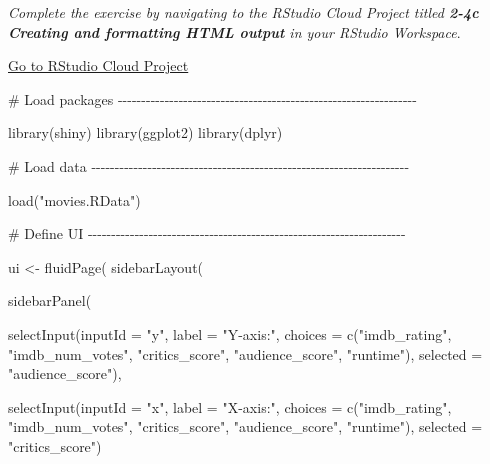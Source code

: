 \documentclass[
  letterpaper,
  DIV=11,
  numbers=noendperiod]{scrreprt}
\newenvironment{Shaded}{\begin{snugshade}}{\end{snugshade}}
\newcommand{\AttributeTok}[1]{\textcolor[rgb]{0.40,0.46,0.14}{#1}}
\newcommand{\CommentTok}[1]{\textcolor[rgb]{0.37,0.37,0.37}{#1}}
\newcommand{\FunctionTok}[1]{\textcolor[rgb]{0.28,0.35,0.67}{#1}}
\newcommand{\NormalTok}[1]{\textcolor[rgb]{0.00,0.46,0.62}{#1}}
\newcommand{\OtherTok}[1]{\textcolor[rgb]{0.00,0.46,0.62}{#1}}
\newcommand{\StringTok}[1]{\textcolor[rgb]{0.13,0.47,0.30}{#1}}
\begin{document}
\emph{Complete the exercise by navigating to the RStudio Cloud Project
titled \textbf{2-4c Creating and formatting HTML output} in your RStudio
Workspace}.

\href{https://rstudio.cloud/spaces/81721/join?access_code=I4VJaNsKfTqR3Td9hLP7E1nz8\%2FtMg6Xbw9Bgqumv}{
Go to RStudio Cloud Project}

\begin{Shaded}
\begin{Highlighting}[]
\CommentTok{\# Load packages {-}{-}{-}{-}{-}{-}{-}{-}{-}{-}{-}{-}{-}{-}{-}{-}{-}{-}{-}{-}{-}{-}{-}{-}{-}{-}{-}{-}{-}{-}{-}{-}{-}{-}{-}{-}{-}{-}{-}{-}{-}{-}{-}{-}{-}{-}{-}{-}{-}{-}{-}{-}{-}{-}{-}{-}{-}{-}{-}{-}{-}{-}{-}{-}}

\FunctionTok{library}\NormalTok{(shiny)}
\FunctionTok{library}\NormalTok{(ggplot2)}
\FunctionTok{library}\NormalTok{(dplyr)}

\CommentTok{\# Load data {-}{-}{-}{-}{-}{-}{-}{-}{-}{-}{-}{-}{-}{-}{-}{-}{-}{-}{-}{-}{-}{-}{-}{-}{-}{-}{-}{-}{-}{-}{-}{-}{-}{-}{-}{-}{-}{-}{-}{-}{-}{-}{-}{-}{-}{-}{-}{-}{-}{-}{-}{-}{-}{-}{-}{-}{-}{-}{-}{-}{-}{-}{-}{-}{-}{-}{-}{-}}

\FunctionTok{load}\NormalTok{(}\StringTok{"movies.RData"}\NormalTok{)}

\CommentTok{\# Define UI {-}{-}{-}{-}{-}{-}{-}{-}{-}{-}{-}{-}{-}{-}{-}{-}{-}{-}{-}{-}{-}{-}{-}{-}{-}{-}{-}{-}{-}{-}{-}{-}{-}{-}{-}{-}{-}{-}{-}{-}{-}{-}{-}{-}{-}{-}{-}{-}{-}{-}{-}{-}{-}{-}{-}{-}{-}{-}{-}{-}{-}{-}{-}{-}{-}{-}{-}{-}}

\NormalTok{ui }\OtherTok{\textless{}{-}} \FunctionTok{fluidPage}\NormalTok{(}
  \FunctionTok{sidebarLayout}\NormalTok{(}
    
    \FunctionTok{sidebarPanel}\NormalTok{(}
      
      \FunctionTok{selectInput}\NormalTok{(}\AttributeTok{inputId =} \StringTok{"y"}\NormalTok{,}
                  \AttributeTok{label =} \StringTok{"Y{-}axis:"}\NormalTok{,}
                  \AttributeTok{choices =} \FunctionTok{c}\NormalTok{(}\StringTok{"imdb\_rating"}\NormalTok{, }\StringTok{"imdb\_num\_votes"}\NormalTok{, }\StringTok{"critics\_score"}\NormalTok{, }\StringTok{"audience\_score"}\NormalTok{, }\StringTok{"runtime"}\NormalTok{),}
                  \AttributeTok{selected =} \StringTok{"audience\_score"}\NormalTok{),}
      
      \FunctionTok{selectInput}\NormalTok{(}\AttributeTok{inputId =} \StringTok{"x"}\NormalTok{,}
                  \AttributeTok{label =} \StringTok{"X{-}axis:"}\NormalTok{,}
                  \AttributeTok{choices =} \FunctionTok{c}\NormalTok{(}\StringTok{"imdb\_rating"}\NormalTok{, }\StringTok{"imdb\_num\_votes"}\NormalTok{, }\StringTok{"critics\_score"}\NormalTok{, }\StringTok{"audience\_score"}\NormalTok{, }\StringTok{"runtime"}\NormalTok{),}
                  \AttributeTok{selected =} \StringTok{"critics\_score"}\NormalTok{)}
      

\end{Highlighting}
\end{Shaded}
\end{document}
